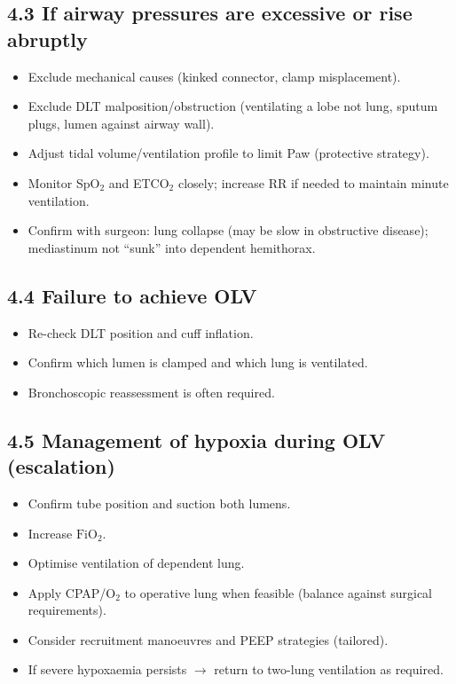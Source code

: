 \documentclass[11pt,a4paper]{article}
\begin{document}
\subsection{4.3 If airway pressures are excessive or rise abruptly}
\begin{itemize}[leftmargin=*, itemsep=2pt]
  \item Exclude mechanical causes (kinked connector, clamp misplacement).
  \item Exclude DLT malposition/obstruction (ventilating a lobe not lung, sputum plugs, lumen against airway wall).
  \item Adjust tidal volume/ventilation profile to limit Paw (protective strategy).
  \item Monitor SpO\(_2\) and ETCO\(_2\) closely; increase RR if needed to maintain minute ventilation.
  \item Confirm with surgeon: lung collapse (may be slow in obstructive disease); mediastinum not ``sunk'' into dependent hemithorax.
\end{itemize}

\subsection{4.4 Failure to achieve OLV}
\begin{itemize}[leftmargin=*, itemsep=2pt]
  \item Re-check DLT position and cuff inflation.
  \item Confirm which lumen is clamped and which lung is ventilated.
  \item Bronchoscopic reassessment is often required.
\end{itemize}

\subsection{4.5 Management of hypoxia during OLV (escalation)}
\begin{itemize}[leftmargin=*, itemsep=2pt]
  \item Confirm tube position and suction both lumens.
  \item Increase \(\mathrm{FiO_2}\).
  \item Optimise ventilation of dependent lung.
  \item Apply CPAP/\(\mathrm{O_2}\) to operative lung when feasible (balance against surgical requirements).
  \item Consider recruitment manoeuvres and PEEP strategies (tailored).
  \item If severe hypoxaemia persists \(\rightarrow\) return to two-lung ventilation as required.
\end{itemize}
\end{document}
